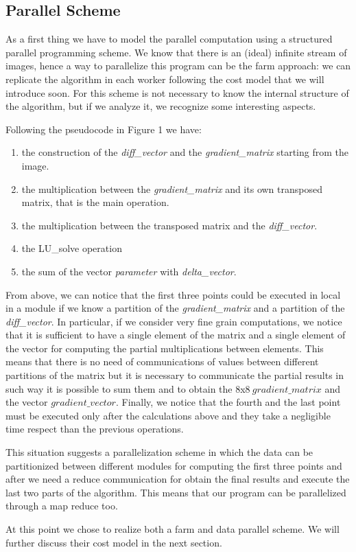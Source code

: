 \subsection{Parallel Scheme}

As a first thing we have to model the parallel computation using a structured parallel programming scheme. We know that there is an (ideal) infinite stream of images, hence a way to parallelize this program can be the farm approach: we can replicate the algorithm in each worker following the cost model that we will introduce soon. For this scheme is not necessary to know the internal structure of the algorithm, but if we analyze it, we recognize some interesting aspects.

Following the pseudocode in Figure 1 we have:
\begin{enumerate}
\item the construction of the \textit{diff\_vector} and the \textit{gradient\_matrix} starting from the image.
\item the multiplication between the \textit{gradient\_matrix} and its own transposed matrix, that is the main operation.
\item the multiplication between the transposed matrix and the \textit{diff\_vector}.
\item the LU\_solve operation
\item the sum of the vector \textit{parameter} with \textit{delta\_vector}.
\end{enumerate}

From above, we can notice that the first three points could be executed in local in a module if we know a partition of the \textit{gradient\_matrix} and a partition of the \textit{diff\_vector}. In particular, if we consider very fine grain computations, we notice that it is sufficient to have a single element of the matrix and a single element of the vector for computing the partial multiplications between elements. This means that there is no need of communications of values between different partitions of the matrix but it is necessary to communicate the partial results in such way it is possible to sum them and to obtain the $8$x$8\ gradient\_matrix$ and the vector $gradient\_vector$. Finally, we notice that the fourth and the last point must be executed only after the calculations above and they take a negligible time respect than the previous operations.

This situation suggests a parallelization scheme in which the data can be partitionized between different modules for computing the first three points and after we need a reduce communication for obtain the final results and execute the last two parts of the algorithm. This means that our program can be parallelized through a map reduce too.

At this point we chose to realize both a farm and data parallel scheme. We will further discuss their cost model in the next section.
